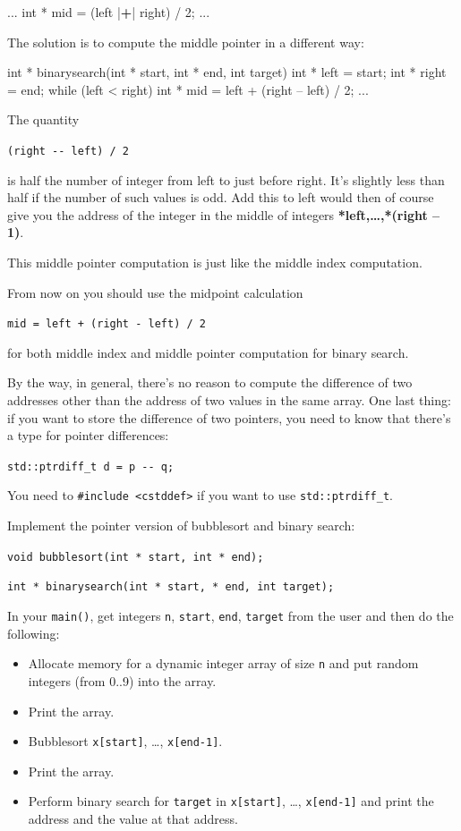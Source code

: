 \begin{consolethree}[escapeinside=||]
...
int * mid = (left |{\bf +}| right) / 2;
...
\end{consolethree}

The solution is to compute the middle pointer in a different way:

\begin{consolethree}[escapeinside=||]
int * binarysearch(int * start, int * end,
                   int target)
{
    int * left = start;
    int * right = end;
    while (left < right)
    {
        int * mid = left + (right -- left) / 2;
        ...
    }
}
\end{consolethree}

The quantity

\verb!(right -- left) / 2!

is half the number of integer from left to just before right. It's
slightly less than half if the number of such values is odd. Add this to
left would then of course give you the address of the integer in the
middle of integers \textbf{*left,\ldots,*(right -- 1)}.

This middle pointer computation is just like the middle index
computation.

From now on you should use the midpoint calculation

\verb!mid = left + (right - left) / 2!

for both middle index and middle pointer computation for binary search.

By the way, in general, there's no reason to compute the difference of
two addresses other than the address of two values in the same array.
One last thing: if you want to store the difference of two pointers, you
need to know that there's a type for pointer differences:

\verb!std::ptrdiff_t d = p -- q;!

You need to \verb!#include <cstddef>! if you want to use
\texttt{std::ptrdiff\_t}.

\begin{ex}
Implement the pointer version of bubblesort and
binary search:

\verb!void bubblesort(int * start, int * end);!

\verb!int * binarysearch(int * start, * end, int target);!

In your \texttt{main()}, get integers \texttt{n}, \texttt{start}, \texttt{end},
\texttt{target} from the user and then do the following:

\begin{itemize}
\item
  Allocate memory for a dynamic integer array of size \texttt{n} and put
  random integers (from 0..9) into the array.
\item
  Print the array.
\item
  Bubblesort \texttt{x[start]}, \ldots, \texttt{x[end-1]}.
\item
  Print the array.
\item
  Perform binary search for \texttt{target} in \texttt{x[start]},
  \ldots, \texttt{x[end-1]} and print the address and the value at
  that address.
\end{itemize}
\end{ex}

